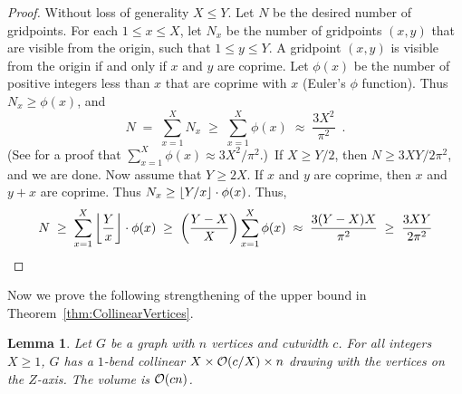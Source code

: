 \documentclass[a4paper]{article}
\newcommand{\Oh}[1]{\ensuremath{\protect\mathcal{O}(#1)}}
\newcommand{\FLOOR}[1]{\ensuremath{\protect\left\lfloor#1\right\rfloor}}
\newcommand{\floor}[1]{\ensuremath{\protect\lfloor#1\rfloor}}
\newcommand{\bracket}[1]{\ensuremath{\protect\left(#1\right)}}
\newcommand{\lemlabel}[1]{\label{lem:#1}}
\newcommand{\thmref}[1]{Theorem~\ref{thm:#1}}
\theoremstyle{plain}
\newtheorem{lemma}{Lemma}
\begin{document}
\begin{proof}  
Without loss of generality $X\leq Y$.   Let $N$ be the desired
number of gridpoints.  For each $1\leq x\leq X$, let $N_x$ be the number of
gridpoints $(x,y)$ that are visible from the origin, such that $1\leq y\leq Y$.
A gridpoint $(x,y)$ is visible from the origin if and only if $x$ and $y$ are
coprime. Let $\phi(x)$ be the number of positive integers less than $x$ that
are coprime with $x$ (Euler's $\phi$ function). Thus $N_x\geq\phi(x)$, and
\begin{equation*}
N\;=\;\sum_{x=1}^XN_x\;\geq\;\sum_{x=1}^X\phi(x)\;\approx\;\frac{3X^2}{\pi^2}\enspace.
\end{equation*}
(See \citep{HW79} for a proof that 
$\sum_{x=1}^X\phi(x)\approx3X^2/\pi^2$.)\ If $X\geq Y/2$, then  $N\geq
3XY/2\pi^2$, and we are done.  Now assume that $Y\geq 2X$. If $x$ and $y$ are
coprime, then $x$ and $y+x$ are coprime. Thus $N_x\geq
\floor{Y/x}\cdot\phi(x)$. Thus,
\begin{equation*}
N
\;\geq\;
\sum_{x=1}^X\FLOOR{\frac{Y}{x}}\cdot\phi(x)
\;\geq\;
\bracket{\frac{Y-X}{X}}\sum_{x=1}^X\phi(x)
\;\approx\;
\frac{3(Y-X)X}{\pi^2}
\;\geq\;
\frac{3XY}{2\pi^2}
\end{equation*}
\end{proof}



Now we prove the following strengthening of the upper bound in
\thmref{CollinearVertices}.

\begin{lemma}
\lemlabel{CutwidthUpperBound} 
Let $G$ be a graph with $n$ vertices and cutwidth $c$. 
For all integers $X\geq1$, $G$ has a $1$-bend collinear  $X\times\Oh{c/X}\times n$ drawing with the vertices on the $Z$-axis. The volume is \Oh{cn}.
\end{lemma}
\end{document}
